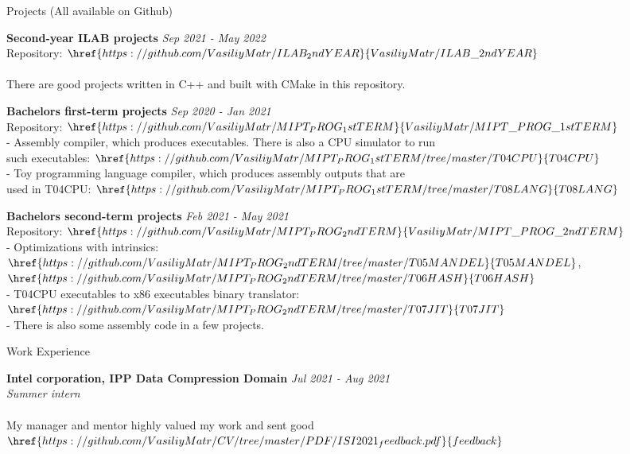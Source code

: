 \documentclass{resume} %
\begin{document}
\begin{rSection}{Projects (All available on Github)}

{\bf Second-year ILAB projects} \hfill {\em Sep 2021 - May 2022}
\\ {Repository: $\href {https://github.com/VasiliyMatr/ILAB_2ndYEAR}
    {VasiliyMatr/ILAB\_2ndYEAR}$}
\\
\\ There are good projects written in C++ and built with CMake in this repository.

{\bf Bachelors first-term projects} \hfill {\em Sep 2020 - Jan 2021}
\\ Repository: $\href {https://github.com/VasiliyMatr/MIPT_PROG_1stTERM}
    {VasiliyMatr/MIPT\_PROG\_1stTERM}$
\\- Assembly compiler, which produces executables. There is also a CPU simulator to run \\
    such executables:
    $\href {https://github.com/VasiliyMatr/MIPT_PROG_1stTERM/tree/master/T04CPU}{T04CPU}$
\\- Toy programming language compiler, which produces assembly outputs that are  \\
    used in T04CPU:
    $\href {https://github.com/VasiliyMatr/MIPT_PROG_1stTERM/tree/master/T08LANG}{T08LANG}$


{\bf Bachelors second-term projects} \hfill {\em Feb 2021 - May 2021}
\\ Repository: $\href {https://github.com/VasiliyMatr/MIPT_PROG_2ndTERM}
    {VasiliyMatr/MIPT\_PROG\_2ndTERM}$
\\- Optimizations with intrinsics:
    $\href {https://github.com/VasiliyMatr/MIPT_PROG_2ndTERM/tree/master/T05MANDEL}{T05MANDEL}$,
    $\href {https://github.com/VasiliyMatr/MIPT_PROG_2ndTERM/tree/master/T06HASH}{T06HASH}$
\\- T04CPU executables to x86 executables binary translator:
    $\href {https://github.com/VasiliyMatr/MIPT_PROG_2ndTERM/tree/master/T07JIT}{T07JIT}$
\\- There is also some assembly code in a few projects.
\end{rSection}

\begin{rSection}{Work Experience}

{\bf Intel corporation, IPP Data Compression Domain} \hfill {\em Jul 2021 - Aug 2021}
\\{\textit{ Summer intern}}
\\
\\ My manager and mentor highly valued my work and sent good
    $\href {https://github.com/VasiliyMatr/CV/tree/master/PDF/ISI2021_feedback.pdf}{feedback}$

\end{rSection}
\end{document}
